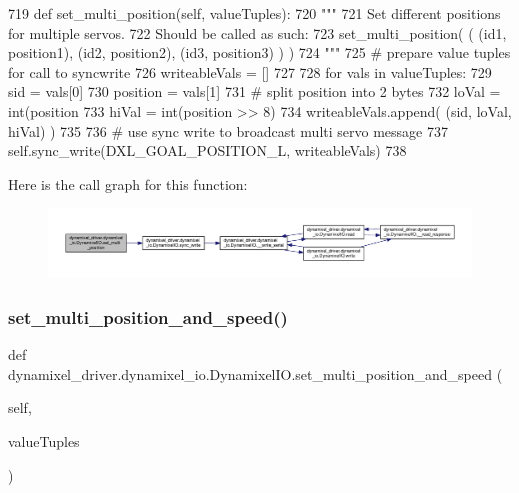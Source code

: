 \begin{DoxyCode}
719     \textcolor{keyword}{def }set\_multi\_position(self, valueTuples):
720         \textcolor{stringliteral}{"""}
721 \textcolor{stringliteral}{        Set different positions for multiple servos.}
722 \textcolor{stringliteral}{        Should be called as such:}
723 \textcolor{stringliteral}{        set\_multi\_position( ( (id1, position1), (id2, position2), (id3, position3) ) )}
724 \textcolor{stringliteral}{        """}
725         \textcolor{comment}{# prepare value tuples for call to syncwrite}
726         writeableVals = []
727 
728         \textcolor{keywordflow}{for} vals \textcolor{keywordflow}{in} valueTuples:
729             sid = vals[0]
730             position = vals[1]
731             \textcolor{comment}{# split position into 2 bytes}
732             loVal = int(position %
733             hiVal = int(position >> 8)
734             writeableVals.append( (sid, loVal, hiVal) )
735 
736         \textcolor{comment}{# use sync write to broadcast multi servo message}
737         self.sync\_write(DXL\_GOAL\_POSITION\_L, writeableVals)
738 
\end{DoxyCode}
Here is the call graph for this function\+:
\nopagebreak
\begin{figure}[H]
\begin{center}
\leavevmode
\includegraphics[width=350pt]{dd/d77/classdynamixel__driver_1_1dynamixel__io_1_1_dynamixel_i_o_aca2d90dab958dcc6d058c1eb6d7a6e11_cgraph}
\end{center}
\end{figure}
\mbox{\label{classdynamixel__driver_1_1dynamixel__io_1_1_dynamixel_i_o_a124b89dc055f8f5ff807d8d976115529}} 
\subsubsection{\texorpdfstring{set\+\_\+multi\+\_\+position\+\_\+and\+\_\+speed()}{set\_multi\_position\_and\_speed()}}
{\footnotesize\ttfamily def dynamixel\+\_\+driver.\+dynamixel\+\_\+io.\+Dynamixel\+I\+O.\+set\+\_\+multi\+\_\+position\+\_\+and\+\_\+speed (\begin{DoxyParamCaption}\item[{}]{self,  }\item[{}]{value\+Tuples }\end{DoxyParamCaption})}

